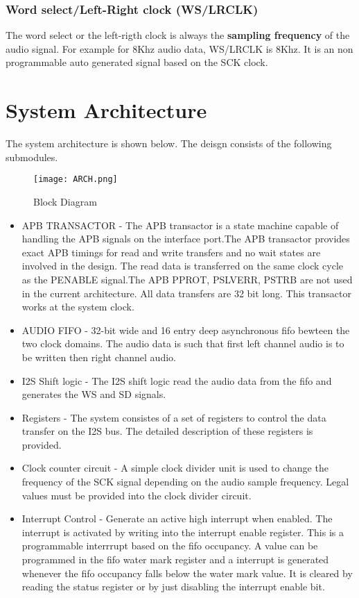 \documentclass[12pt,a4paper]{report}
\begin{document}
\subsection{Word select/Left-Right clock (WS/LRCLK)}

The word select or the left-rigth clock is always the \textbf{sampling frequency} of the audio signal. For example for 8Khz audio data, WS/LRCLK is 8Khz. It is an non programmable auto generated signal based on the SCK clock. 







\chapter{System Architecture}
\thispagestyle{logo}
The system architecture is shown below. The deisgn consists of the following submodules.
\begin{figure}[ht]
\centering
\texttt{[image: ARCH.png]}
\caption{Block Diagram}
\end{figure}

\begin{itemize}
\item	APB TRANSACTOR - The APB transactor is a state machine capable of handling the APB signals on the interface port.The APB transactor provides exact APB timings for read and write transfers and no wait states are involved in the design. The read data is transferred on the  same clock cycle as the PENABLE signal.The APB PPROT, PSLVERR, PSTRB are not used in the current architecture. All data transfers are 32 bit long. This transactor works at the system clock.
\item AUDIO FIFO - 32-bit wide and 16 entry deep asynchronous fifo bewteen the two clock domains. The audio data is such that first left channel audio is to be written then right channel audio. 
\item  I2S Shift logic - The I2S shift logic read the audio data from the fifo and generates the WS and SD signals. 
\item Registers - The system consistes of a set of registers to control the data transfer on the I2S bus. The detailed description of these registers is provided.
\item Clock counter circuit  - A simple clock divider unit is used to change the frequency of the SCK signal depending on the audio sample frequency. Legal values must be provided into the clock divider circuit.
\item Interrupt Control - Generate an active high interrupt when enabled. The interrupt is activated by writing into the interrupt enable register. This is a programmable interrrupt based on the fifo occupancy. A value can be programmed in the fifo water mark register and a interrupt is generated whenever the fifo occupancy falls below the water mark value. It is cleared by reading the status register or by just disabling the interrupt enable bit.
\end{itemize}
\end{document}
